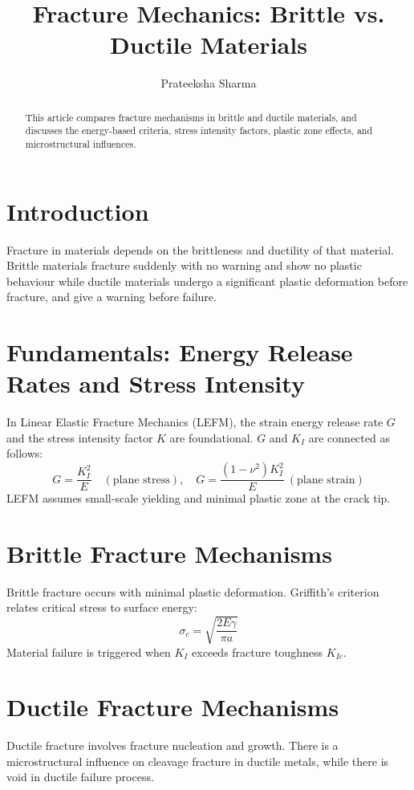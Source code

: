 \documentclass[12pt,a4paper]{article}
\title{Fracture Mechanics: Brittle vs. Ductile Materials}
\author{Prateeksha Sharma}
\date{}
\begin{document}
\maketitle

\begin{abstract}
This article compares fracture mechanisms in brittle and ductile materials, and discusses the energy-based criteria, stress intensity factors, plastic zone effects, and microstructural influences. 
\end{abstract}

\section{Introduction}
Fracture in materials depends on the brittleness and ductility of that material. Brittle materials fracture suddenly with no warning and show no plastic behaviour while ductile materials undergo a significant plastic deformation before fracture, and give a warning before failure.
\section{Fundamentals: Energy Release Rates and Stress Intensity}

In Linear Elastic Fracture Mechanics (LEFM), the strain energy release rate \(G\) and the stress intensity factor \(K\) are foundational. \(G\) and \(K_I\) are connected as follows:
\[
G = \frac{K_I^2}{E} \quad (\text{plane stress}), \quad G = \frac{(1 - \nu^2)K_I^2}{E}\ (\text{plane strain})
\]  
LEFM assumes small-scale yielding and minimal plastic zone at the crack tip.

\section{Brittle Fracture Mechanisms}
Brittle fracture occurs with minimal plastic deformation. Griffith’s criterion relates critical stress to surface energy:  
\[
\sigma_c = \sqrt{\frac{2E\gamma}{\pi a}}
\]  
Material failure is triggered when \(K_I\) exceeds fracture toughness \(K_{Ic}\).

\section{Ductile Fracture Mechanisms}
Ductile fracture involves fracture nucleation and growth. There is a  microstructural influence on cleavage fracture in ductile metals, while there is void in ductile failure process.
\end{document}
